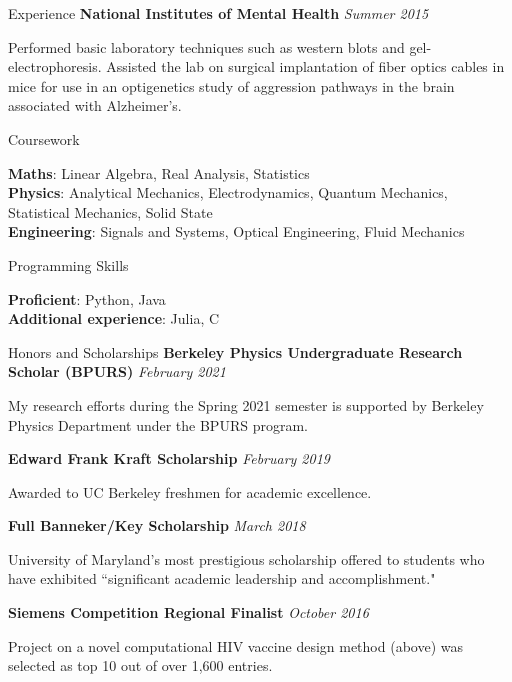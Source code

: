 \documentclass{resume}
\newenvironment{indented}{\vspace{-5pt}\begin{list}{}{\setlength{\leftmargin}{0.5cm}}\item[]}{\end{list}}
\begin{document}
\begin{rSection}{Experience}
		\vspace{-1pt} {\bf National Institutes of Mental Health} \hfill {\em Summer 2015}
		\begin{indented}
			Performed basic laboratory techniques such as western blots and gel-electrophoresis. Assisted the lab on surgical implantation of fiber optics cables in mice for use in an optigenetics study of aggression pathways in the brain associated with Alzheimer's. 
		\end{indented}
	\end{rSection}

	\begin{rSection}{Coursework}
	
	\textbf{Maths}: Linear Algebra, Real Analysis,  Statistics
	\\
	\textbf{Physics}: Analytical Mechanics, Electrodynamics, Quantum Mechanics, Statistical Mechanics, Solid State
	\\
	\textbf{Engineering}: Signals and Systems, Optical Engineering, Fluid Mechanics
	
	\end{rSection}

	\begin{rSection}{Programming Skills}
		
		\textbf{Proficient}: Python, Java
		\\
		\textbf{Additional experience}: Julia, C
		
	\end{rSection}

	\begin{rSection}{Honors and Scholarships}
		{\bf Berkeley Physics Undergraduate Research Scholar (BPURS)} \hfill {\em February 2021}
		\begin{indented}
			My research efforts during the Spring 2021 semester is supported by Berkeley Physics Department under the BPURS program.
		\end{indented}
		{\bf Edward Frank Kraft Scholarship} \hfill {\em February 2019}
		\begin{indented}
			Awarded to UC Berkeley freshmen for academic excellence.
		\end{indented}
	
		\vspace{-1pt} {\bf Full Banneker/Key Scholarship} \hfill {\em March 2018}
		\begin{indented}
			University of Maryland's most prestigious scholarship offered to students who have exhibited ``significant academic leadership and accomplishment."
		\end{indented}
		
		\vspace{-1pt} {\bf Siemens Competition Regional Finalist} \hfill {\em October 2016}
		\begin{indented}
			Project on a novel computational HIV vaccine design method (above) was selected as top 10 out of over 1,600 entries. 
		\end{indented}
	\end{rSection}
\end{document}
